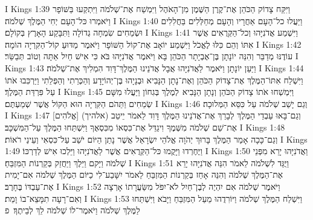 I Kings 1:39	וַיִּקַּח צָדוֹק הַכֹּהֵן אֶת־קֶרֶן הַשֶּׁמֶן מִן־הָאֹהֶל וַיִּמְשַׁח אֶת־שְׁלֹמֹה וַיִּתְקְעוּ בַּשּׁוֹפָר וַיֹּאמְרוּ כּל־הָעָם יְחִי הַמֶּלֶךְ שְׁלֹמֹה׃
I Kings 1:40	וַיַּעֲלוּ כל־הָעָם אַחֲרָיו וְהָעָם מְחַלְּלִים בַּחֲלִלִים וּשְׂמֵחִים שִׂמְחָה גְדוֹלָה וַתִּבָּקַע הָאָרֶץ בְּקוֹלָם׃
I Kings 1:41	וַיִּשְׁמַע אֲדֹנִיָּהוּ וְכל־הַקְּרֻאִים אֲשֶׁר אִתּוֹ וְהֵם כִּלּוּ לֶאֱכֹל וַיִּשְׁמַע יוֹאָב אֶת־קוֹל הַשּׁוֹפָר וַיֹּאמֶר מַדּוּעַ קוֹל־הַקִּרְיָה הוֹמָה׃
I Kings 1:42	עוֹדֶנּוּ מְדַבֵּר וְהִנֵּה יוֹנָתָן בֶּן־אֶבְיָתָר הַכֹּהֵן בָּא וַיֹּאמֶר אֲדֹנִיָּהוּ בֹּא כִּי אִישׁ חַיִל אַתָּה וְטוֹב תְּבַשֵּׂר׃
I Kings 1:43	וַיַּעַן יוֹנָתָן וַיֹּאמֶר לַאֲדֹנִיָּהוּ אֲבָל אֲדֹנֵינוּ הַמֶּלֶךְ־דָּוִד הִמְלִיךְ אֶת־שְׁלֹמֹה׃
I Kings 1:44	וַיִּשְׁלַח אִתּוֹ־הַמֶּלֶךְ אֶת־צָדוֹק הַכֹּהֵן וְאֶת־נָתָן הַנָּבִיא וּבְנָיָהוּ בֶּן־יְהוֹיָדָע וְהַכְּרֵתִי וְהַפְּלֵתִי וַיַּרְכִּבוּ אֹתוֹ עַל פִּרְדַּת הַמֶּלֶךְ׃
I Kings 1:45	וַיִּמְשְׁחוּ אֹתוֹ צָדוֹק הַכֹּהֵן וְנָתָן הַנָּבִיא  לְמֶלֶךְ בְּגִחוֹן וַיַּעֲלוּ מִשָּׁם שְׂמֵחִים וַתֵּהֹם הַקִּרְיָה הוּא הַקּוֹל אֲשֶׁר שְׁמַעְתֶּם׃
I Kings 1:46	וְגַם יָשַׁב שְׁלֹמֹה עַל כִּסֵּא הַמְּלוּכָה׃
I Kings 1:47	וְגַם־בָּאוּ עַבְדֵי הַמֶּלֶךְ לְבָרֵךְ אֶת־אֲדֹנֵינוּ הַמֶּלֶךְ דָּוִד לֵאמֹר יֵיטֵב (אלהיך) [אֱלֹהִים] אֶת־שֵׁם שְׁלֹמֹה מִשְּׁמֶךָ וִיגַדֵּל אֶת־כִּסְאוֹ מִכִּסְאֶךָ וַיִּשְׁתַּחוּ הַמֶּלֶךְ עַל־הַמִּשְׁכָּב׃
I Kings 1:48	וְגַם־כָּכָה אָמַר הַמֶּלֶךְ בָּרוּךְ יְהֹוָה אֱלֹהֵי יִשְׂרָאֵל אֲשֶׁר נָתַן הַיּוֹם יֹשֵׁב עַל־כִּסְאִי וְעֵינַי רֹאוֹת׃
I Kings 1:49	וַיֶּחֶרְדוּ וַיָּקֻמוּ כּל־הַקְּרֻאִים אֲשֶׁר לַאֲדֹנִיָּהוּ וַיֵּלְכוּ אִישׁ לְדַרְכּוֹ׃
I Kings 1:50	וַאֲדֹנִיָּהוּ יָרֵא מִפְּנֵי שְׁלֹמֹה וַיָּקם וַיֵּלֶךְ וַיַּחֲזֵק בְּקַרְנוֹת הַמִּזְבֵּחַ׃
I Kings 1:51	וַיֻּגַּד לִשְׁלֹמֹה לֵאמֹר הִנֵּה אֲדֹנִיָּהוּ יָרֵא אֶת־הַמֶּלֶךְ שְׁלֹמֹה וְהִנֵּה אָחַז בְּקַרְנוֹת הַמִּזְבֵּחַ לֵאמֹר יִשָּׁבַע־לִי כַיּוֹם הַמֶּלֶךְ שְׁלֹמֹה אִם־יָמִית אֶת־עַבְדּוֹ בֶּחָרֶב׃
I Kings 1:52	וַיֹּאמֶר שְׁלֹמֹה אִם יִהְיֶה לְבֶן־חַיִל לֹא־יִפֹּל מִשַּׂעֲרָתוֹ אָרְצָה וְאִם־רָעָה תִמָּצֵא־בוֹ וָמֵת׃
I Kings 1:53	וַיִּשְׁלַח הַמֶּלֶךְ שְׁלֹמֹה וַיּוֹרִדֻהוּ מֵעַל הַמִּזְבֵּחַ וַיָּבֹא וַיִּשְׁתַּחוּ לַמֶּלֶךְ שְׁלֹמֹה וַיֹּאמֶר־לוֹ שְׁלֹמֹה לֵךְ לְבֵיתֶךָ׃ {פ}
